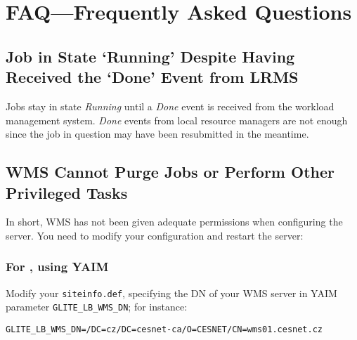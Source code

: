 %
%

\section{FAQ---Frequently Asked Questions}
\label{s:faq}

\subsection{Job in State `Running' Despite Having Received the `Done' Event from LRMS}

Jobs stay in state \emph{Running} until a \emph{Done} event is received from the workload management system. \emph{Done} events from local resource managers are not enough since the job in question may have been resubmitted in the meantime.

\subsection{WMS Cannot Purge Jobs or Perform Other Privileged Tasks}
\label{FAQ:WMS_superusers}

In short, WMS has not been given adequate permissions when configuring the \LB server. You need to modify your configuration and restart the server:

\subsubsection{For , using YAIM}
\label{FAQ:WMS_superusers_3_0_11}
Modify your \texttt{siteinfo.def}, specifying the DN of your WMS server in YAIM parameter \texttt{GLITE\_LB\_WMS\_DN}; for instance:

\begin{center}
\texttt{GLITE\_LB\_WMS\_DN=/DC=cz/DC=cesnet-ca/O=CESNET/CN=wms01.cesnet.cz}
\end{center}


